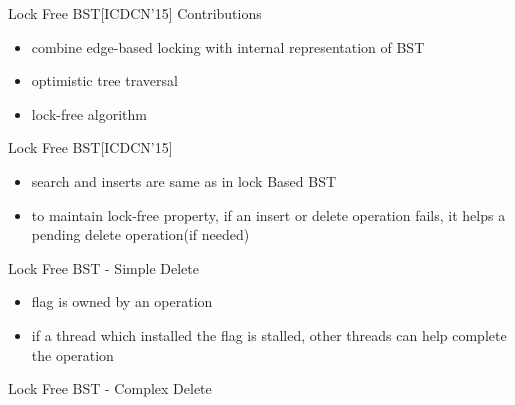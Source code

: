 \begin{frame}[c]{Lock Free BST[ICDCN'15]}
Contributions
\begin{itemize}
\item combine edge-based locking with internal representation of BST 
\item optimistic tree traversal 
\pause
\item lock-free algorithm
\end{itemize}
\end{frame}

\begin{frame}{Lock Free BST[ICDCN'15]}
\begin{itemize}
\item search and inserts are same as in lock Based BST
\item to maintain lock-free property, if an insert or delete operation fails, it helps a pending delete operation(if needed)
\end{itemize} 
\end{frame}

\begin{frame}[c]{Lock Free BST - Simple Delete}
\begin{itemize}
\item flag is owned by an operation
\item if a thread which installed the flag is stalled, other threads can help complete the operation
\end{itemize}
\pause

\end{frame}

\begin{frame}[c]{Lock Free BST - Complex Delete}

\end{frame}